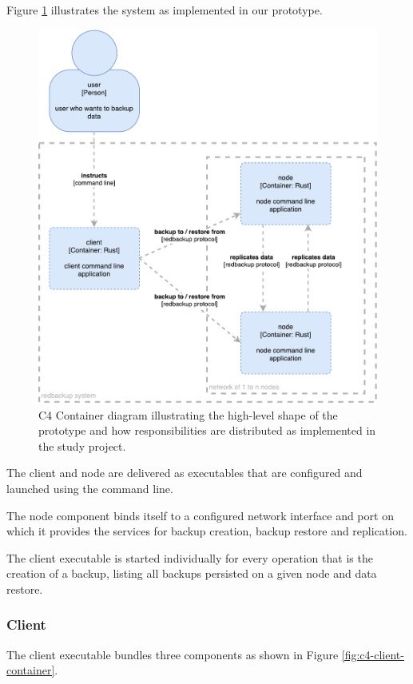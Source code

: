 Figure \ref{fig:c4-sa-container} illustrates the system as implemented in our prototype.

\begin{figure}[h]
	\centering
	\includegraphics[width=0.8\linewidth]{resources/c4-sa-container}
	\caption[SA specific C4 Container diagram]{C4 Container diagram illustrating the high-level shape of the prototype and how responsibilities are distributed as implemented in the study project.}
	\label{fig:c4-sa-container}
\end{figure}

The \gls{client} and \gls{node} are delivered as executables that are configured and launched using the command line.

The \gls{node} component binds itself to a configured network interface and port on which it provides the services for backup creation, backup restore and replication.

The \gls{client} executable is started individually for every operation that is the creation of a backup, listing all backups persisted on a given \gls{node} and data restore.

\subsubsection{Client}

The \gls{client} executable bundles three components as shown in Figure \ref{fig:c4-client-container}.

